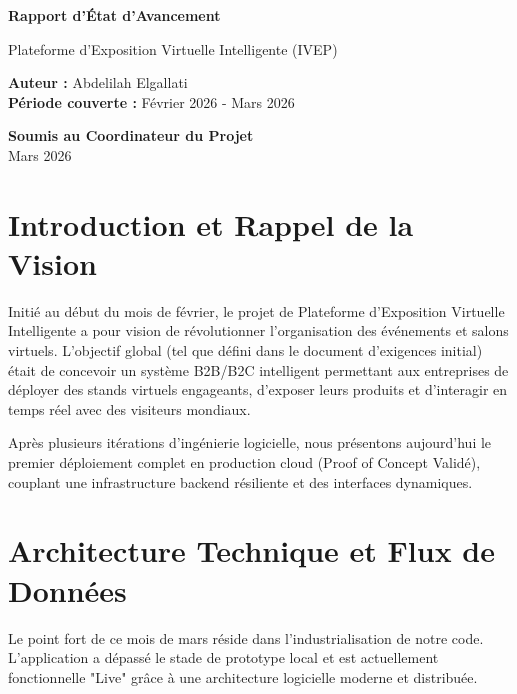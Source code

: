 \documentclass[12pt,a4paper]{article}
\begin{document}
\begin{titlepage}
    \centering
    \vspace*{2cm}
    
    \Huge
    \textbf{\textcolor{primary}{Rapport d'État d'Avancement}}
    
    \vspace{0.5cm}
    \LARGE
    Plateforme d'Exposition Virtuelle Intelligente (IVEP)
    
    \vspace{1.5cm}
    
    \Large
    \textbf{Auteur :} Abdelilah Elgallati \\
    \textbf{Période couverte :} Février 2026 - Mars 2026
    
    \vfill
    
    \normalsize
    \textbf{Soumis au Coordinateur du Projet} \\
    \vspace{0.8cm}
    \Large Mars 2026
    
\end{titlepage}

\tableofcontents
\newpage

\section{Introduction et Rappel de la Vision}
Initié au début du mois de février, le projet de Plateforme d'Exposition Virtuelle Intelligente a pour vision de révolutionner l'organisation des événements et salons virtuels. L'objectif global (tel que défini dans le document d'exigences initial) était de concevoir un système B2B/B2C intelligent permettant aux entreprises de déployer des stands virtuels engageants, d'exposer leurs produits et d'interagir en temps réel avec des visiteurs mondiaux.

Après plusieurs itérations d'ingénierie logicielle, nous présentons aujourd'hui le premier déploiement complet en production cloud (Proof of Concept Validé), couplant une infrastructure backend résiliente et des interfaces dynamiques.

\section{Architecture Technique et Flux de Données}
Le point fort de ce mois de mars réside dans l'industrialisation de notre code. L'application a dépassé le stade de prototype local et est actuellement fonctionnelle "Live" grâce à une architecture logicielle moderne et distribuée. 
\end{document}
